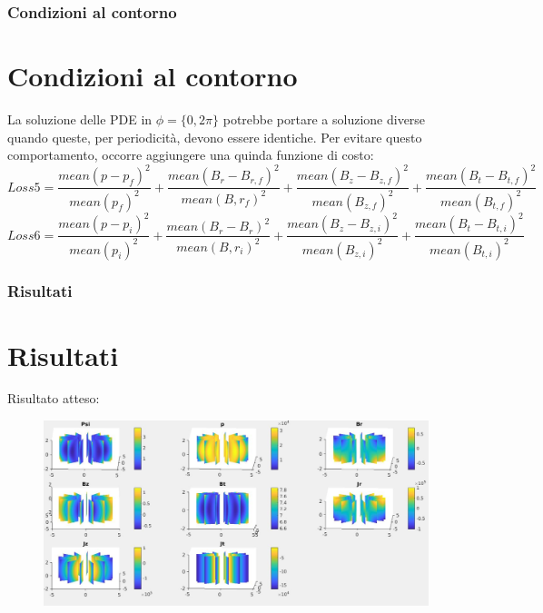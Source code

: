 \documentclass{beamer}
\begin{document}
\begin{frame}
	\frametitle{Condizioni al contorno}
	\section{Condizioni al contorno}
	La soluzione delle PDE in \(\phi = \{ 0,2\pi \} \) potrebbe portare a soluzione diverse quando queste, per periodicità, devono essere identiche. Per evitare questo comportamento, occorre aggiungere una quinda funzione di costo:\begin{equation*}
		Loss5 = \frac{mean{(p-p_{f})}^{2}}{mean{(p_{f})}^{2}}+\frac{mean{(B_{r}-B_{r,f})}^{2}}{mean{(B,r_{f})}^{2}}+\frac{mean{(B_{z}-B_{z,f})}^{2}}{mean{(B_{z,f})}^{2}}+\frac{mean{(B_{t}-B_{t,f})}^{2}}{mean{(B_{t,f})}^{2}}
	\end{equation*}
	\begin{equation*}
		Loss6 = \frac{mean{(p-p_{i})}^{2}}{mean{(p_{i})}^{2}}+\frac{mean{(B_{r}-B_{r})}^{2}}{mean{(B,r_{i})}^{2}}+\frac{mean{(B_{z}-B_{z,i})}^{2}}{mean{(B_{z,i})}^{2}}+\frac{mean{(B_{t}-B_{t,i})}^{2}}{mean{(B_{t,i})}^{2}}
	\end{equation*}
\end{frame}
\begin{frame}
	\frametitle{Risultati}
	\section{Risultati}
		Risultato atteso:
		\begin{figure}
			\includegraphics[scale=0.3]{2022-06-20-23-05-27.png}%
		\end{figure}
\end{frame}
\end{document}
